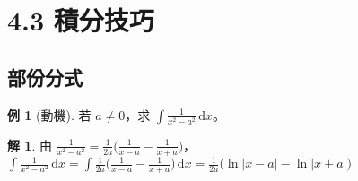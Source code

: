 \documentclass[12pt]{extarticle}
\newcommand{\ds}{\displaystyle}
\theoremstyle{definition}
\newtheorem*{ex}{例}
\newtheorem*{sol}{解}
\newcommand{\myline}{\noindent\makebox[\linewidth]{\rule{\paperwidth}{0.4pt}}}
\begin{document}
\myline

\section*{4.3 積分技巧}

\subsection*{部份分式}

\begin{ex}[動機]
  若 $a\ne 0$，求 $\ds\int\!\frac{1}{x^2 - a^2}\,\text{d}x$。
\end{ex}

\begin{sol}
  由 $\ds\frac{1}{x^2 - a^2} = \frac{1}{2a}\bigg(\frac{1}{x - a} - \frac{1}{x + a}\bigg)$，$\ds\int\!\frac{1}{x^2 - a^2}\,\text{d}x = \int\frac{1}{2a}\bigg(\frac{1}{x - a} - \frac{1}{x + a}\bigg)\,\text{d}x = \frac{1}{2a}\big(\ln|x - a| - \ln|x + a|\big)$
\end{sol}
\end{document}

